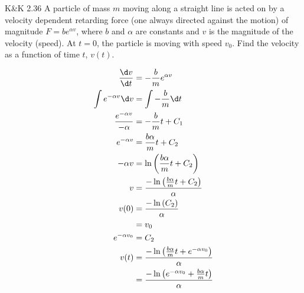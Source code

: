 \documentclass{esg8012pset}
\begin{document}
\begin{problem}{K\&K 2.36}
  A particle of mass $m$ moving along a straight line is acted on by a velocity dependent retarding force (one always directed against the motion) of magnitude $F = be^{\alpha v}$, where $b$ and $\alpha$ are constants and $v$ is the magnitude of the velocity (speed). At $t = 0$, the particle is moving with speed $v_0$. Find the velocity as a function of time $t$, $v(t)$.
\end{problem}
\begin{solution}
  \begin{align*}
    \frac{\d v}{\d t} & = -\frac{b}{m}e^{\alpha v} \\
    \int e^{-\alpha v} \d v & = \int -\frac{b}{m}\d t \\
    \frac{e^{-\alpha v}}{-\alpha} & = -\frac{b}{m}t + C_1 \\
    e^{-\alpha v} & = \frac{b\alpha}{m}t + C_2 \\
    -\alpha v & = \ln\left(\frac{b\alpha}{m}t + C_2\right) \\
    v & = \frac{-\ln\left(\frac{b\alpha}{m}t + C_2\right)}{\alpha} \\
    v(0) & = \frac{-\ln\left(C_2\right)}{\alpha} \\
         & = v_0 \\
    e^{-\alpha v_0} & = C_2 \\
    v(t) & = \frac{-\ln\left(\frac{b\alpha}{m}t + e^{-\alpha v_0}\right)}{\alpha} \\
     & = \frac{-\ln\left(e^{-\alpha v_0} + \frac{b\alpha}{m}t\right)}{\alpha}
  \end{align*}
\end{solution}
\end{document}
